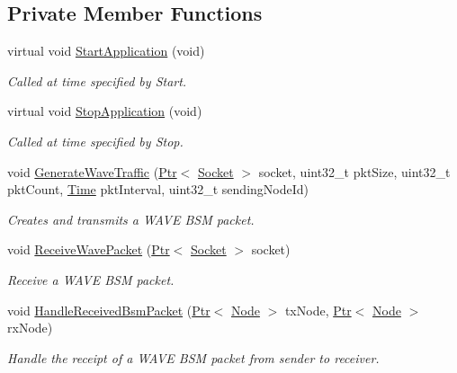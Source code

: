 \subsection*{Private Member Functions}
\begin{DoxyCompactItemize}
\item 
virtual void \hyperlink{classns3_1_1BsmApplication_a2caf2e381d781dfde58e39f19a220523}{Start\+Application} (void)
\begin{DoxyCompactList}\small\item\em Called at time specified by Start. \end{DoxyCompactList}\item 
virtual void \hyperlink{classns3_1_1BsmApplication_a704b500c0ca87cc950a90e1544e9bbcd}{Stop\+Application} (void)
\begin{DoxyCompactList}\small\item\em Called at time specified by Stop. \end{DoxyCompactList}\item 
void \hyperlink{classns3_1_1BsmApplication_a22a009e7512e5df69dd9b81f96d15f51}{Generate\+Wave\+Traffic} (\hyperlink{classns3_1_1Ptr}{Ptr}$<$ \hyperlink{classns3_1_1Socket}{Socket} $>$ socket, uint32\+\_\+t pkt\+Size, uint32\+\_\+t pkt\+Count, \hyperlink{classns3_1_1Time}{Time} pkt\+Interval, uint32\+\_\+t sending\+Node\+Id)
\begin{DoxyCompactList}\small\item\em Creates and transmits a W\+A\+VE B\+SM packet. \end{DoxyCompactList}\item 
void \hyperlink{classns3_1_1BsmApplication_a554561257f6be190892532b80e7eeb81}{Receive\+Wave\+Packet} (\hyperlink{classns3_1_1Ptr}{Ptr}$<$ \hyperlink{classns3_1_1Socket}{Socket} $>$ socket)
\begin{DoxyCompactList}\small\item\em Receive a W\+A\+VE B\+SM packet. \end{DoxyCompactList}\item 
void \hyperlink{classns3_1_1BsmApplication_ac70236a81b0967274fd55884f4935741}{Handle\+Received\+Bsm\+Packet} (\hyperlink{classns3_1_1Ptr}{Ptr}$<$ \hyperlink{classns3_1_1Node}{Node} $>$ tx\+Node, \hyperlink{classns3_1_1Ptr}{Ptr}$<$ \hyperlink{classns3_1_1Node}{Node} $>$ rx\+Node)
\begin{DoxyCompactList}\small\item\em Handle the receipt of a W\+A\+VE B\+SM packet from sender to receiver. \end{DoxyCompactList}\item 

\end{DoxyCompactItemize}
